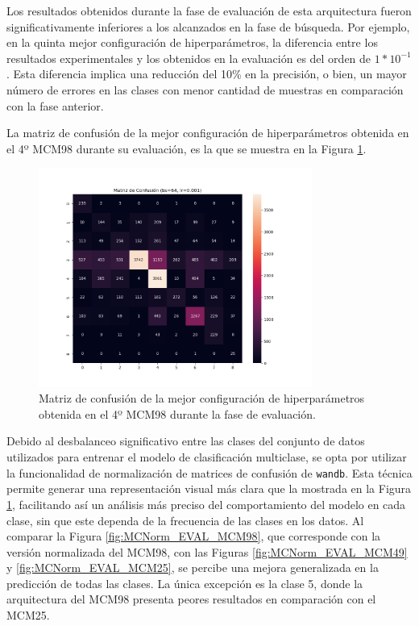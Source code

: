 Los resultados obtenidos durante la fase de evaluación de esta arquitectura fueron significativamente inferiores a los alcanzados en la fase de búsqueda. Por ejemplo, en la quinta mejor configuración de hiperparámetros, la diferencia entre los resultados experimentales y los obtenidos en la evaluación es del orden de $1*10^{-1}$. Esta diferencia implica una reducción del 10\% en la precisión, o bien, un mayor número de errores en las clases con menor cantidad de muestras en comparación con la fase anterior.


La matriz de confusión de la mejor configuración de hiperparámetros obtenida en el 4º MCM98 durante su evaluación, es la que se muestra en la Figura \ref{fig:MC_EVAL_MCM98}.

\begin{figure}[H]
    \centering
    \includegraphics[width=0.8\textwidth]{./img/evaluacion/matrices_confusion/MC_EVAL_MCM98.png}
    \caption{Matriz de confusión de la mejor configuración de hiperparámetros obtenida en el 4º MCM98 durante la fase de evaluación.}
    \label{fig:MC_EVAL_MCM98}
\end{figure}

Debido al desbalanceo significativo entre las clases del conjunto de datos utilizados para entrenar el modelo de clasificación multiclase, se opta por utilizar la funcionalidad de normalización de matrices de confusión de \texttt{wandb}. Esta técnica permite generar una representación visual más clara que la mostrada en la Figura \ref{fig:MC_EVAL_MCM98}, facilitando así un análisis más preciso del comportamiento del modelo en cada clase, sin que este dependa de la frecuencia de las clases en los datos. Al comparar la Figura \ref{fig:MCNorm_EVAL_MCM98}, que corresponde con la versión normalizada del MCM98,  con las Figuras \ref{fig:MCNorm_EVAL_MCM49} y \ref{fig:MCNorm_EVAL_MCM25}, se percibe una mejora generalizada en la predicción de todas las clases. La única excepción es la clase 5, donde la arquitectura del MCM98 presenta peores resultados en comparación con el MCM25.

